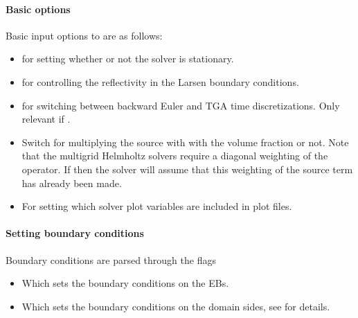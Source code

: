 \documentclass[letterpaper,10pt,english]{sphinxmanual}
\begin{document}
\paragraph{Basic options}
\label{\detokenize{Solvers/RTE:basic-options}}
\sphinxAtStartPar
Basic input options to  are as follows:
\begin{itemize}
\item {} 
\sphinxAtStartPar
{} for setting whether or not the solver is stationary.

\item {} 
\sphinxAtStartPar
{} for controlling the reflectivity in the Larsen boundary conditions.

\item {} 
\sphinxAtStartPar
{} for switching between backward Euler and TGA time discretizations.
Only relevant if .

\item {} 
\sphinxAtStartPar
{} Switch for multiplying the source with with the volume fraction or not.
Note that the multigrid Helmholtz solvers require a diagonal weighting of the operator.
If  then the solver will assume that this weighting of the source term has already been made.

\item {} 
\sphinxAtStartPar
{} For setting which solver plot variables are included in plot files.

\end{itemize}


\paragraph{Setting boundary conditions}
\label{\detokenize{Solvers/RTE:setting-boundary-conditions}}
\sphinxAtStartPar
Boundary conditions are parsed through the flags
\begin{itemize}
\item {} 
\sphinxAtStartPar
{} Which sets the boundary conditions on the EBs.

\item {} 
\sphinxAtStartPar
{} Which sets the boundary conditions on the domain sides, see {\hyperref[\detokenize{Solvers/RTE:chap-eddingtonsp1bc}]{}} for details.

\end{itemize}
\end{document}
